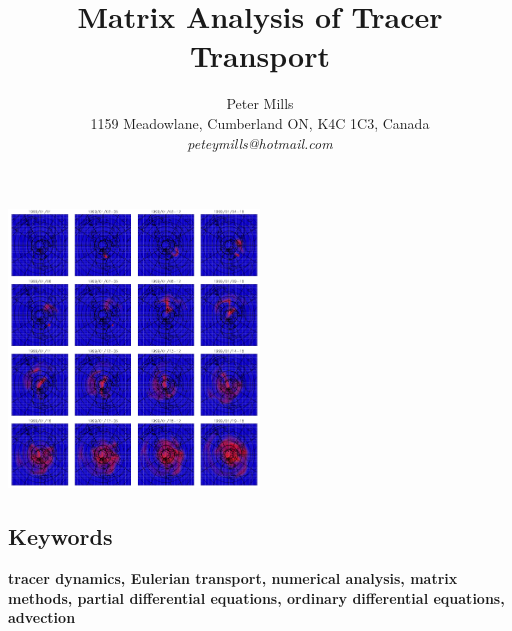 \documentclass[11pt]{article}
\begin{document}
\title{Matrix Analysis of Tracer Transport}
\author{Peter Mills\\
1159 Meadowlane, Cumberland ON, K4C 1C3, Canada\\
\textit{peteymills@hotmail.com}}

\maketitle

\begin{center}
\includegraphics[width=0.5\textwidth]{tt_cover_graphic}
\end{center}

\pagestyle{myheadings}

\begin{abstract}
	
\end{abstract}

\subsection*{Keywords}
\textbf{tracer dynamics, Eulerian transport, numerical analysis, matrix methods, partial differential equations, ordinary differential equations, advection}

\tableofcontents





\newpage


\end{document}
